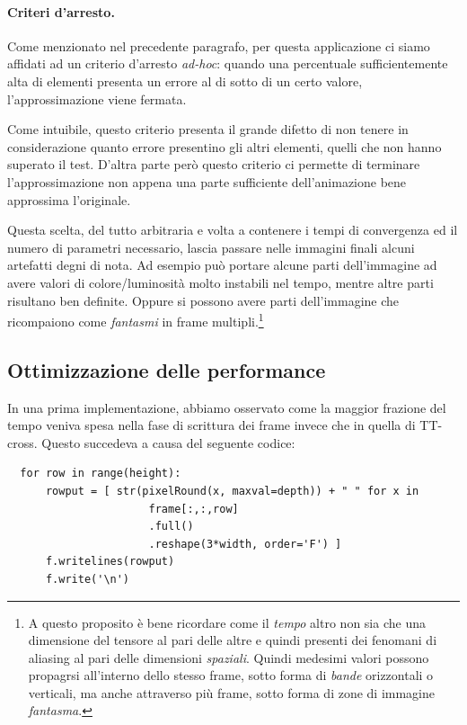 \documentclass[11pt,a4paper]{article}
\begin{document}
\paragraph{Criteri d'arresto.}
Come menzionato nel precedente paragrafo, per questa applicazione ci siamo affidati ad un criterio d'arresto \emph{ad-hoc}: quando una percentuale sufficientemente alta di elementi presenta un errore al di sotto di un certo valore, l'approssimazione viene fermata.

Come intuibile, questo criterio presenta il grande difetto di non tenere in considerazione quanto errore presentino gli altri elementi, quelli che non hanno superato il test.
D'altra parte però questo criterio ci permette di terminare l'approssimazione non appena una parte sufficiente dell'animazione bene approssima l'originale.

Questa scelta, del tutto arbitraria e volta a contenere i tempi di convergenza ed il numero di parametri necessario, lascia passare nelle immagini finali alcuni artefatti degni di nota. Ad esempio può portare alcune parti dell'immagine ad avere valori di colore/luminosità molto instabili nel tempo, mentre altre parti risultano ben definite. Oppure si possono avere parti dell'immagine che ricompaiono come \emph{fantasmi} in frame  multipli.\footnote{A questo proposito è bene ricordare come il \emph{tempo} altro non sia che una dimensione del tensore al pari delle altre e quindi presenti dei fenomani di aliasing al pari delle dimensioni \emph{spaziali}. Quindi medesimi valori possono propagrsi all'interno dello stesso frame, sotto forma di \emph{bande} orizzontali o verticali, ma anche attraverso più frame, sotto forma di zone di immagine \emph{fantasma}.}

\subsection{Ottimizzazione delle performance}
In una prima implementazione,  abbiamo osservato come la maggior frazione del tempo veniva spesa nella fase di scrittura dei frame invece che in quella di TT-cross.
Questo succedeva a causa del seguente codice: 

\begin{lstlisting}
  for row in range(height):
      rowput = [ str(pixelRound(x, maxval=depth)) + " " for x in 
                      frame[:,:,row]
                      .full()
                      .reshape(3*width, order='F') ]
      f.writelines(rowput)
      f.write('\n')
\end{lstlisting}
\end{document}
